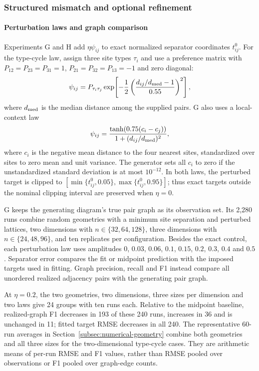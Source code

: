 \subsubsection{Structured mismatch and optional refinement}
\label{app:synthetic-mismatch}

\paragraph{Perturbation laws and graph comparison}
Experiments G and H add $\eta\psi_{ij}$ to exact normalized separator
coordinates $t_{ij}^{0}$. For the type-cycle law, assign three site types
$\tau_i$ and use a preference matrix with
$P_{12}=P_{23}=P_{31}=1$, $P_{21}=P_{32}=P_{13}=-1$ and zero diagonal:
\[
\psi_{ij}=P_{\tau_i\tau_j}
\exp\!\left[-\frac12\left(\frac{d_{ij}/d_{\rm med}-1}{0.55}\right)^2\right],
\]
where $d_{\rm med}$ is the median distance among the supplied pairs.
G also uses a local-context law
\[
\psi_{ij}=\frac{\tanh\!\left(0.75(c_i-c_j)\right)}
                  {1+(d_{ij}/d_{\rm med})^2},
\]
where $c_i$ is the negative mean distance to the four nearest sites,
standardized over sites to zero mean and unit variance. The generator sets
all $c_i$ to zero if the unstandardized standard deviation is at most
$10^{-12}$. In both laws, the perturbed target is clipped to
$[\min\{t_{ij}^{0},0.05\},\max\{t_{ij}^{0},0.95\}]$; thus exact targets
outside the nominal clipping interval are preserved when $\eta=0$.

G keeps the generating diagram's true pair graph as its observation set.
Its 2,280 runs combine random geometries with a minimum site separation and
perturbed lattices, two dimensions with $n\in\{32,64,128\}$, three dimensions
with $n\in\{24,48,96\}$, and ten replicates per configuration. Besides the
exact control, each perturbation law uses amplitudes $0$, $0.03$, $0.06$,
$0.1$, $0.15$, $0.2$, $0.3$, $0.4$ and $0.5$.
Separator error compares the fit or midpoint prediction with the imposed
targets used in fitting. Graph precision, recall and F1 instead compare all
unordered realized adjacency pairs with the generating pair graph.

At $\eta=0.2$, the two geometries, two dimensions, three sizes per dimension
and two laws give 24 groups with ten runs each. Relative to the midpoint
baseline, realized-graph F1 decreases in 193 of these 240 runs, increases in
36 and is unchanged in 11; fitted target RMSE decreases in all 240.
The representative 60-run averages in Section~\ref{subsec:numerical-geometry}
combine both geometries and all three sizes for the two-dimensional type-cycle
cases. They are arithmetic means of per-run RMSE and F1 values, rather than
RMSE pooled over observations or F1 pooled over graph-edge counts.

